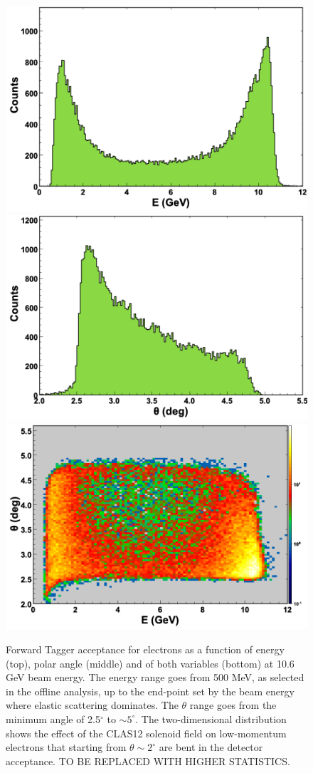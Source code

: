 \begin{figure}[ht]
\begin{center}
\includegraphics[height=0.56\columnwidth]{fig/ft_acceptance_energy.png}
\includegraphics[height=0.56\columnwidth]{fig/ft_acceptance_theta.png}
\includegraphics[height=0.56\columnwidth]{fig/ft_acceptance_energytheta.png}
\end{center}
\caption{Forward Tagger acceptance for electrons as a function of energy (top), polar angle (middle) and of both variables (bottom) at 10.6 GeV beam energy. The energy range goes from 500 MeV, as selected in the offline analysis, up to the end-point set by the beam energy where elastic scattering dominates. The $\theta$ range goes from the minimum angle of 2.5$^\circ$ to $\sim5^\circ$. The two-dimensional distribution shows the effect of the CLAS12 solenoid field on low-momentum electrons that starting from $\theta\sim2^\circ$ are bent in the detector acceptance. TO BE REPLACED WITH HIGHER STATISTICS.}
\label{fig:ft_acceptance}
\end{figure}

